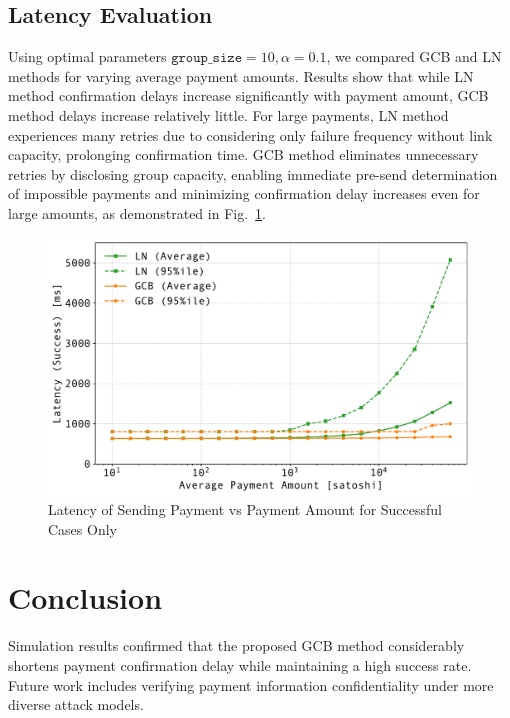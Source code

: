 \documentclass[conference]{IEEEtran}
\newcommand{\groupsize}{\texttt{group\_size}}
\begin{document}
\subsection{Latency Evaluation}

Using optimal parameters $\groupsize=10, \alpha=0.1$, we compared GCB and LN methods for varying average payment amounts. Results show that while LN method confirmation delays increase significantly with payment amount, GCB method delays increase relatively little. For large payments, LN method experiences many retries due to considering only failure frequency without link capacity, prolonging confirmation time. GCB method eliminates unnecessary retries by disclosing group capacity, enabling immediate pre-send determination of impossible payments and minimizing confirmation delay increases even for large amounts, as demonstrated in Fig.~\ref{fig:pmt_amt_vs_time}.

\begin{figure}[htbp]
	\centerline{\includegraphics[width=\linewidth]{fig/pmt_amt_vs_time}}
	\caption{Latency of Sending Payment vs Payment Amount for Successful Cases Only}
	\label{fig:pmt_amt_vs_time}
\end{figure}

\section{Conclusion}

Simulation results confirmed that the proposed GCB method considerably shortens payment confirmation delay while maintaining a high success rate. Future work includes verifying payment information confidentiality under more diverse attack models.
\end{document}

